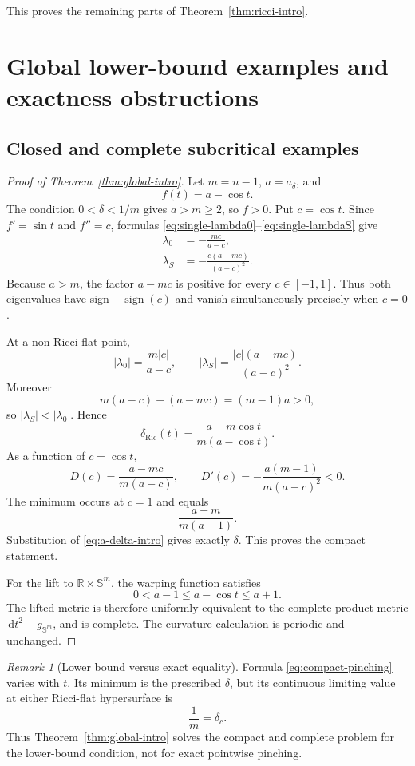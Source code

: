 \documentclass[11pt,reqno]{amsart}
\theoremstyle{definition}
\theoremstyle{remark}
\newtheorem{remark}[theorem]{Remark}
\newcommand{\dd}{\,\mathrm d}
\newcommand{\R}{\mathbb R}
\newcommand{\Sph}{\mathbb S}
\newcommand{\dric}{\delta_{\mathrm{Ric}}}
\newcommand{\abs}[1]{\lvert #1\rvert}
\begin{document}
This proves the remaining parts of Theorem~\ref{thm:ricci-intro}.

\section{Global lower-bound examples and exactness obstructions}\label{sec:global-obstructions}

\subsection{Closed and complete subcritical examples}

\begin{proof}[Proof of Theorem~\ref{thm:global-intro}]
Let $m=n-1$, $a=a_\delta$, and
\[
f(t)=a-\cos t.
\]
The condition $0<\delta<1/m$ gives $a>m\ge2$, so $f>0$.  Put $c=\cos t$.  Since $f'=\sin t$ and $f''=c$, formulas \eqref{eq:single-lambda0}--\eqref{eq:single-lambdaS} give
\begin{align}
\lambda_0&=-\frac{mc}{a-c},\label{eq:compact-lambda0}\\
\lambda_S&=-\frac{c(a-mc)}{(a-c)^2}.
\label{eq:compact-lambdaS}
\end{align}
Because $a>m$, the factor $a-mc$ is positive for every $c\in[-1,1]$.  Thus both eigenvalues have sign $-\operatorname{sign}(c)$ and vanish simultaneously precisely when $c=0$.

At a non-Ricci-flat point,
\[
\abs{\lambda_0}=\frac{m\abs c}{a-c},
\qquad
\abs{\lambda_S}=\frac{\abs c(a-mc)}{(a-c)^2}.
\]
Moreover
\[
m(a-c)-(a-mc)=(m-1)a>0,
\]
so $\abs{\lambda_S}<\abs{\lambda_0}$.  Hence
\begin{equation}\label{eq:compact-pinching}
\dric(t)=\frac{a-m\cos t}{m(a-\cos t)}.
\end{equation}
As a function of $c=\cos t$,
\[
D(c)=\frac{a-mc}{m(a-c)},
\qquad
D'(c)=-\frac{a(m-1)}{m(a-c)^2}<0.
\]
The minimum occurs at $c=1$ and equals
\[
\frac{a-m}{m(a-1)}.
\]
Substitution of \eqref{eq:a-delta-intro} gives exactly $\delta$.  This proves the compact statement.

For the lift to $\R\times\Sph^m$, the warping function satisfies
\[
0<a-1\le a-\cos t\le a+1.
\]
The lifted metric is therefore uniformly equivalent to the complete product metric $\dd t^2+g_{\Sph^m}$, and is complete.  The curvature calculation is periodic and unchanged.
\end{proof}

\begin{remark}[Lower bound versus exact equality]\label{rem:not-exact}
Formula \eqref{eq:compact-pinching} varies with $t$.  Its minimum is the prescribed $\delta$, but its continuous limiting value at either Ricci-flat hypersurface is
\[
\frac1m=\delta_c.
\]
Thus Theorem~\ref{thm:global-intro} solves the compact and complete problem for the lower-bound condition, not for exact pointwise pinching.
\end{remark}
\end{document}
